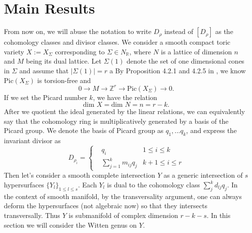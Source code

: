 \documentclass[11pt]{article}
\newcommand{\reals}{\mathbb R}
\newcommand{\intg}{\mathbb Z}
\begin{document}
\section{Main Results}
From now on, we will abuse the notation to write $D_\rho$ instead of $[D_\rho]$ as the cohomology classes and divisor classes. We consider a smooth compact toric variety $X:=X_\Sigma$ corresponding to $\Sigma\in N_\reals$, where $N$ is a lattice of dimension $n$ and $M$ being its dual lattice. Let $\Sigma(1)$ denote the set of one dimensional cones in $\Sigma$ and assume that $|\Sigma(1)|=r$ a By Proposition 4.2.1 and 4.2.5 in \cite{cox2009toric}, we know $\text{Pic}(X_\Sigma)$ is torsion-free and
\begin{equation*}
0\longrightarrow M\longrightarrow \intg^r\longrightarrow \text{Pic}(X_\Sigma)\longrightarrow 0.
\end{equation*}
If we set the Picard number $k$, we have the relation
\begin{equation*}
	\text{dim }X =\text{dim }N=n=r-k.
\end{equation*}
After we quotient the ideal generated by the linear relations, we can equivalently say that the cohomology ring is multiplicatively generated by a basis of the Picard group. We denote the basis of Picard group as $q_1,...q_k$, and express the invariant divisor as
\begin{equation*}
D_{\rho_i}=\left\{
\begin{aligned}
& q_i & 1\leq i\leq k\\
& \sum_{j=1}^k m_{i j} q_j  &k+1\leq i\leq r
\end{aligned}
\right.
\end{equation*}
Then let's consider a smooth complete intersection $Y$ as a generic intersection of $s$ hypersurfaces $\{Y_l\}_{1\leq l\leq s}$. Each $Y_l$ is dual to the cohomology class $\sum_{j}^k d_{l j} q_j$. In the context of smooth manifold, by the transversality argument, one can always deform the hypersurfaces (not algebraic now) so that they intersects transversally. Thus $Y$ is submanifold of complex dimension $r-k-s$. In this section we will consider the Witten genus on $Y$.
\end{document}
